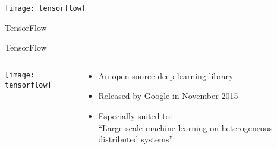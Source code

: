 
{
\begin{slide}{}
  \vspace{1.5cm}

  \texttt{[image: tensorflow]}

  \vspace{1cm}

  {
    \Huge
    \color{orange}
    TensorFlow
  }
\end{slide}
}

\addtocounter{framenumber}{-1}

\begin{slide}{TensorFlow}
\begin{columns}
  \begin{column}{0.5\textwidth}
    \hspace{1cm}\texttt{[image: tensorflow]}
  \end{column}
  \begin{column}{0.5\textwidth}
    \begin{itemize}
    \item<1-> An open source deep learning library
    \item<2-> Released by Google in November 2015
    \item<3-> Especially suited to:\\
              \vspace{0.2cm}
              ``Large-scale machine learning on
                heterogeneous distributed systems''
    \end{itemize}
  \end{column}
\end{columns}
\end{slide}

\graphicspath{{tensorflow-paper/presentation/figures/}}



% 

%

